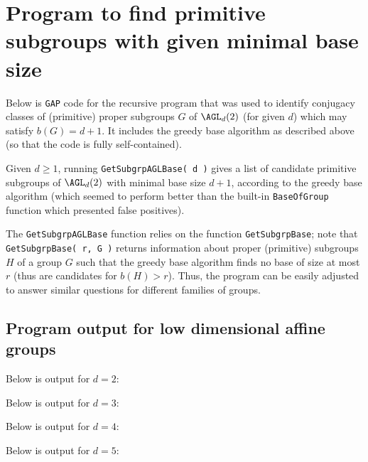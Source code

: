 \section{Program to find primitive subgroups with given minimal base size}

Below is \texttt{GAP} code for the recursive program that was used to identify conjugacy classes of (primitive) proper subgroups $G$ of $\AGL_d(2)$ (for given $d$) which may satisfy $b(G) = d + 1$. It includes the greedy base algorithm as described above (so that the code is fully self-contained).

Given $d \geq 1$, running \texttt{GetSubgrpAGLBase( d )} gives a list of candidate primitive subgroups of $\AGL_d(2)$ with minimal base size $d + 1$, according to the greedy base algorithm (which seemed to perform better than the built-in \texttt{BaseOfGroup} function which presented false positives).

The \texttt{GetSubgrpAGLBase} function relies on the function \texttt{GetSubgrpBase}; note that \texttt{GetSubgrpBase( r, G )} returns information about proper (primitive) subgroups $H$ of a group $G$ such that the greedy base algorithm finds no base of size at most $r$ (thus are candidates for $b(H) > r$). Thus, the program can be easily adjusted to answer similar questions for different families of groups.\label{app:subgrps_base_len}




% 

\subsection{Program output for low dimensional affine groups}\label{app:agl_output}

Below is output for $d = 2$:



Below is output for $d = 3$:



Below is output for $d = 4$:



Below is output for $d = 5$:



